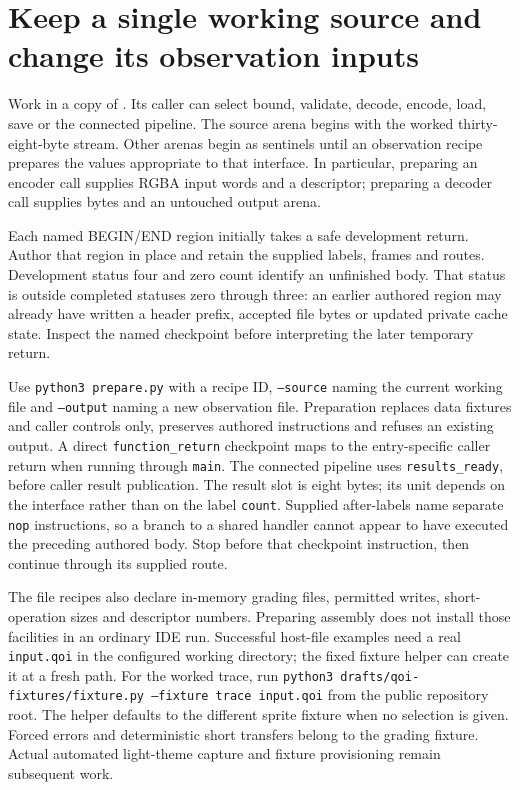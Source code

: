 \section{Keep a single working source and change its observation inputs}
Work in a copy of . Its caller can select bound,
validate, decode, encode, load, save or the connected pipeline. The source arena begins
with the worked thirty-eight-byte stream. Other arenas begin as sentinels until an
observation recipe prepares the values appropriate to that interface. In particular,
preparing an encoder call supplies RGBA input words and a descriptor; preparing a
decoder call supplies bytes and an untouched output arena.

Each named BEGIN/END region initially takes a safe development return. Author that
region in place and retain the supplied labels, frames and routes. Development status
four and zero count identify an unfinished body. That status is outside completed
statuses zero through three: an earlier authored region may already have written a
header prefix, accepted file bytes or updated private cache state. Inspect the named
checkpoint before interpreting the later temporary return.

Use \texttt{python3 prepare.py} with a recipe ID, \texttt{--source} naming the current
working file and \texttt{--output} naming a new observation file. Preparation replaces
data fixtures and caller controls only, preserves authored instructions and refuses an
existing output. A direct \texttt{function\_return} checkpoint maps to the entry-specific
caller return when running through \texttt{main}. The connected pipeline uses
\texttt{results\_ready}, before caller result publication. The result slot is eight bytes;
its unit depends on the interface rather than on the label \texttt{count}.
Supplied after-labels name separate \texttt{nop} instructions, so a branch to a shared
handler cannot appear to have executed the preceding authored body. Stop before that
checkpoint instruction, then continue through its supplied route.

The file recipes also declare in-memory grading files, permitted writes, short-operation
sizes and descriptor numbers. Preparing assembly does not install those facilities in
an ordinary IDE run. Successful host-file examples need a real \texttt{input.qoi} in
the configured working directory; the fixed fixture helper can create it at a fresh
path. For the worked trace, run \texttt{python3 drafts/qoi-fixtures/fixture.py --fixture trace input.qoi} from the public repository root. The helper defaults to the different sprite fixture when no selection is given. Forced errors and deterministic short transfers belong to the grading fixture.
Actual automated light-theme capture and fixture provisioning remain subsequent work.

